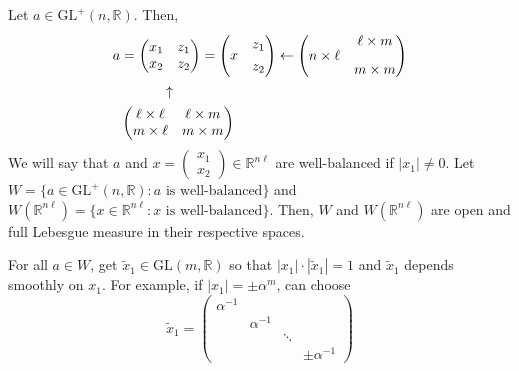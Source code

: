 \documentclass[11pt]{article}
\theoremstyle{definition}
\begin{document}
Let $a \in  \mathrm{GL}^+(n, \mathbb{R}) $. Then,
\begin{align*}
    a &=
    \begin{pmatrix}
        x_1 & z_1  \\
        x_2 & z_2
    \end{pmatrix}
    =
    \begin{pmatrix}
        & z_1  \\
        \raisebox{.8em}{$x$} & z_2
    \end{pmatrix}
    \leftarrow
    \begin{pmatrix}
        & \ell \times m  \\
        \raisebox{1em}{$n \times \ell$} & m \times m
    \end{pmatrix}\\
    & \ \ \ \ \ \ \ \ \ \uparrow \\
    &
    \begin{pmatrix}
        \ell \times \ell & \ell \times m  \\
        m \times \ell    & m \times m
    \end{pmatrix}
\end{align*}
We will say that $a$ and $x =
\begin{pmatrix}
    x_1 \\
    x_2
\end{pmatrix} \in \mathbb{R}^{n\ell }$ are well-balanced if $|x_1| \neq 0$.
Let $W= \{a \in \mathrm{GL}^+(n, \mathbb{R}): a\text{ is well-balanced}\}$ and $W(\mathbb{R}^{n\ell }) = \{x \in \mathbb{R}^{n\ell } : x \text{ is well-balanced}\}$.
Then, $W$ and $W(\mathbb{R}^{n\ell })$ are open and full Lebesgue measure in their respective spaces.

For all $a \in W$, get $\widetilde{x}_1 \in \mathrm{GL}(m, \mathbb{R})$ so that $|x_1| \cdot |\widetilde{x}_1|=1$ and $\widetilde{x}_1$ depends smoothly on $x_1$.
For example, if $|x_1|= \pm \alpha ^m$, can choose
\[
    \widetilde{x}_1=
    \begin{pmatrix}
        \alpha ^{-1} &   \\
        \            & \alpha ^{-1} \\
        \            &              & \ddots \\
        \            &              &              & \pm \alpha ^{-1}
    \end{pmatrix}
\]
\end{document}
